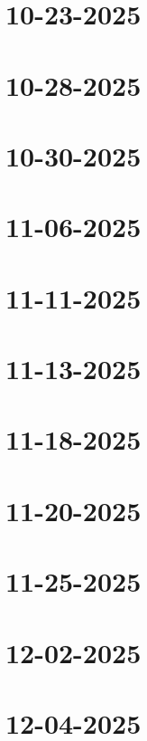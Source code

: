 \documentclass[]{mangos-musings}
\begin{document}
\section{10-23-2025}

\newpage
\section{10-28-2025}

\newpage
\section{10-30-2025}

\newpage
\section{11-06-2025}

\newpage
\section{11-11-2025}

\newpage
\section{11-13-2025}

\newpage
\section{11-18-2025}

\newpage
\section{11-20-2025}

\newpage
\section{11-25-2025}

\newpage
\section{12-02-2025}

\newpage
\section{12-04-2025}
\end{document}

